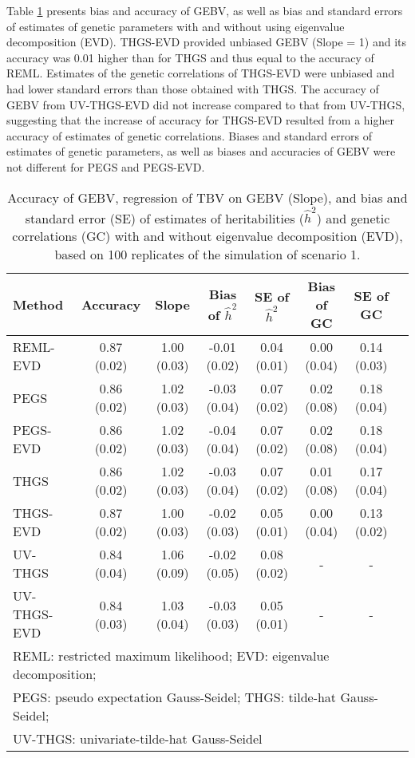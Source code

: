 \documentclass{bmcart}
\begin{document}
Table \ref{ExTH} presents bias and accuracy of GEBV, as well as bias and standard errors of estimates of genetic parameters with and without using eigenvalue decomposition (EVD). THGS-EVD provided unbiased GEBV (Slope = 1) and its accuracy was 0.01 higher than for THGS and thus equal to the accuracy of REML. Estimates of the genetic correlations of THGS-EVD were unbiased and had lower standard errors than those obtained with THGS. The accuracy of GEBV from UV-THGS-EVD did not increase compared to that from UV-THGS, suggesting that the increase of accuracy for THGS-EVD resulted from a higher accuracy of estimates of genetic correlations. Biases and standard errors of estimates of genetic parameters, as well as biases and accuracies of GEBV were not different for PEGS and PEGS-EVD.

\begin{table}[ht]
\centering
\renewcommand*{\arraystretch}{1.2}
\caption{Accuracy of GEBV, regression of TBV on GEBV (Slope), and bias and standard error (SE) of estimates of heritabilities ($\hat{h}^2$) and genetic correlations (GC) with and without eigenvalue decomposition (EVD), based on 100 replicates of the simulation of scenario 1.}\smallskip
\begin{tabular}{l c c c c c c c }
\hline
Method & Accuracy & Slope  & Bias of $\hat{h}^2$ & SE of $\hat{h}^2$ & Bias of GC & SE of GC   \\
\hline
REML-EVD & 0.87 (0.02) & 1.00 (0.03) & -0.01 (0.02) & 0.04 (0.01) & 0.00 (0.04) & 0.14 (0.03) \\
PEGS & 0.86 (0.02) & 1.02 (0.03) & -0.03 (0.04) & 0.07 (0.02) & 0.02 (0.08) & 0.18 (0.04) \\
PEGS-EVD & 0.86 (0.02) & 1.02 (0.03) & -0.04 (0.04) & 0.07 (0.02) & 0.02 (0.08) & 0.18 (0.04) \\
THGS & 0.86 (0.02) & 1.02 (0.03) & -0.03 (0.04) & 0.07 (0.02) & 0.01 (0.08) & 0.17 (0.04) \\
THGS-EVD & 0.87 (0.02) & 1.00 (0.03) & -0.02 (0.03) & 0.05 (0.01) & 0.00 (0.04) & 0.13 (0.02) \\
UV-THGS & 0.84 (0.04) & 1.06 (0.09) & -0.02 (0.05) & 0.08 (0.02) & - & - \\
UV-THGS-EVD & 0.84 (0.03) & 1.03 (0.04) & -0.03 (0.03) & 0.05 (0.01) & - & - \\
\hline
\multicolumn{7}{l}{\small REML: restricted maximum likelihood; EVD: eigenvalue decomposition; }\\
\multicolumn{7}{l}{\small PEGS: pseudo expectation Gauss-Seidel; THGS: tilde-hat Gauss-Seidel;}\\
\multicolumn{7}{l}{\small UV-THGS: univariate-tilde-hat Gauss-Seidel}\\
\end{tabular}
\label{ExTH}
\end{table}
\end{document}
